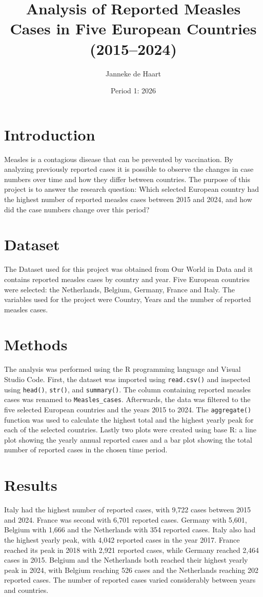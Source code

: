 \documentclass[10pt,a4paper]{article}
\title{\vspace{-2cm}\bfseries\Large Analysis of Reported Measles Cases in Five European Countries (2015--2024)}
\author{Janneke de Haart}
\date{Period 1: 2026}
\begin{document}
\maketitle
\vspace{-1.1cm}

\section{Introduction}
Measles is a contagious disease that can be prevented by vaccination. By analyzing previously reported cases it is possible to observe the changes in case numbers over time and how they differ between countries. 
The purpose of this project is to answer the research question: Which selected European country had the highest number of reported measles cases between 2015 and 2024, and how did the case numbers change over this period?

\section{Dataset}
The Dataset used for this project was obtained from Our World in Data and it contains reported measles cases by country and year.
Five European countries were selected: the Netherlands, Belgium, Germany, France and Italy.
The variables used for the project were Country, Years and the number of reported measles cases.

\section{Methods}
The analysis was performed using the R programming language and Visual Studio Code.
First, the dataset was imported using \texttt{read.csv()} and inspected using \texttt{head()}, \texttt{str()}, and \texttt{summary()}. The column containing reported measles cases was renamed to \texttt{Measles\_cases}. Afterwards, the data was filtered to the five selected European countries and the years 2015 to 2024. The \texttt{aggregate()} function was used to calculate the highest total and the highest yearly peak for each of the selected countries. Lastly two plots were created using base R: a line plot showing the yearly annual reported cases and a bar plot showing the total number of reported cases in the chosen time period.

\section{Results}
Italy had the highest number of reported cases, with 9,722 cases between 2015 and 2024. France was second with 6,701 reported cases. Germany with 5,601, Belgium with 1,666 and the Netherlands with 354 reported cases.
Italy also had the highest yearly peak, with 4,042 reported cases in the year 2017. France reached its peak in 2018 with 2,921 reported cases, while Germany reached 2,464 cases in 2015. Belgium and the Netherlands both reached their highest yearly peak in 2024, with Belgium reaching 526 cases and the Netherlands reaching 202 reported cases.
The number of reported cases varied considerably between years and countries.
\end{document}
